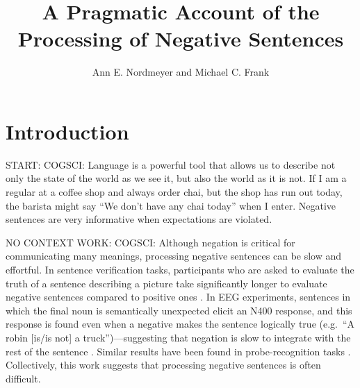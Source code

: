 \documentclass[man]{apa2}
\title{A Pragmatic Account of the Processing of Negative Sentences}
\author{Ann E. Nordmeyer and Michael C. Frank}
\begin{document}
\maketitle


\section{Introduction}

START:
COGSCI:
Language is a powerful tool that allows us to describe not only the state of the world as we see it, but also the world as it is not.  If I am a regular at a coffee shop and always order chai, but the shop has run out today, the barista might say ``We don't have any chai today'' when I enter.  Negative sentences are very informative when expectations are violated.



NO CONTEXT WORK: 
COGSCI:
Although negation is critical for communicating many meanings, processing negative sentences can be slow and effortful.  In sentence verification tasks, participants who are asked to evaluate the truth of a sentence describing a picture take significantly longer to evaluate negative sentences compared to positive ones \cite{hclark1972, carpenter1975, just1971, just1976}. In EEG experiments, sentences in which the final noun is semantically unexpected elicit an N400 response, and this response is found even when a negative makes the sentence logically true (e.g.\ ``A robin [is/is not] a truck'')---suggesting that negation is slow to integrate with the rest of the sentence \cite{fischler1983, ludtke2008}.  Similar results have been found in probe-recognition tasks \cite{kaup2003, kaup2006, hasson2006}.  Collectively, this work suggests that processing negative sentences is often difficult.
\end{document}
